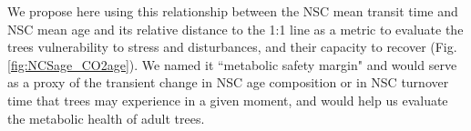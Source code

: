 \documentclass{article}
\begin{document}
We propose here using this relationship between the NSC mean transit time and NSC mean age and its relative distance to the 1:1 line as a metric to evaluate the trees vulnerability to stress and disturbances, and their capacity to recover (Fig. \ref{fig:NCSage_CO2age}). We named it ``metabolic safety margin" and would serve as a proxy of the transient change in NSC age composition or in NSC turnover time that trees may experience in a given moment, and would help us evaluate the metabolic health of adult trees. 



%
%
%
%
%
%
\end{document}
